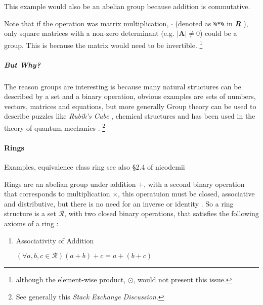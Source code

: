 \documentclass[a4paper,11pt,twoside]{article}
\begin{document}
This example would also be an abelian group because addition is commutative.

Note that if the operation was matrix multiplication, \(\cdot\)
(denoted as \texttt{\%*\%} in \textbf{\emph{R}}
\cite{rcoreteamLanguageEnvironmentStatistical2020}), only square
matrices with a non-zero determinant
(e.g. \(\left\lvert\mathbf{A}\right\rvert \neq 0\)) could be a
group. This is because the matrix would need to be invertible. \footnote{although the element-wise product, \(\odot\), would not present this issue.}

\subparagraph{But Why?}
\label{sec:orgad05a5b}
The reason groups are interesting is because many natural
structures can be described by a set and a binary operation,
obvious examples are sets of numbers, vectors, matrices and
equations, but more generally Group theory can be used to describe
puzzles like \emph{Rubik's Cube} \cite{joynerAdventuresGroupTheory2002},
chemical structures \cite{GroupTheoryIts2013} and has been used in
the theory of
quantum mechanics \cite{tinkhamGroupTheoryQuantum2003}. \footnote{See generally this \cite{19328} \emph{Stack Exchange Discussion}.}

\paragraph{Rings}
\label{sec:org99348ea}
Examples, equivalence class ring
\cite[Ch. 3]{judsonAbstractAlgebraTheory2016} see also \S 2.4 of
nicodemii \cite[\S 2.4]{nicodemiIntroductionAbstractAlgebra2007a}

Rings are an abelian group under addition \(+\), with a second binary
operation that corresponds to multiplication \(\times\), this
operatuion must be closed, associative and distributive, but there is
no need for an inverse or identity
\cite[\S 8.1]{gregoryleeAbstractAlgebra2018}. So a ring structure
is a set \(\mathcal{R}\), with two closed binary operations, that
satisfies the following axioms of a ring
\cite[\S\S 2.4-2.6]{nicodemiIntroductionAbstractAlgebra2007a}:

\begin{enumerate}
\item Associativity of Addition

\(\left( \forall a,b,c \in \mathcal{R} \right) \left( a+ b \right) +  c = a +  \left(  b +  c    \right)\)
\end{enumerate}
\end{document}
